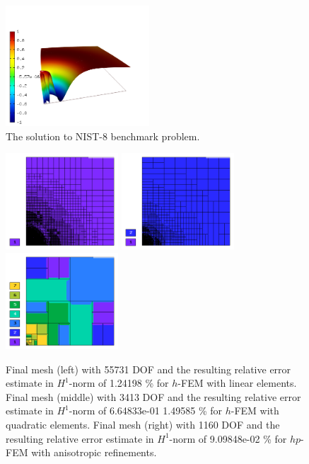 \documentclass[12pt]{elsarticle}
\begin{document}
\begin{figure}[H]
\centering
\vspace{-5mm}
\includegraphics[height=4.5cm]{nist/nist-8/solution.png}
\vspace{-5mm}
\caption{The solution to NIST-8 benchmark problem.}
\vspace{-2mm}
\label{fig:sln-nist08}
\end{figure}

\begin{figure}[H]
\centering
\vspace{-5mm}
\includegraphics[height=3.6cm]{nist/nist-8/mesh_h1_aniso.png}
\includegraphics[height=3.6cm]{nist/nist-8/mesh_h2_aniso.png}
\includegraphics[height=3.6cm]{nist/nist-8/mesh_hp_aniso.png}
\vspace{-5mm}
\caption{
Final mesh (left) with 55731 DOF and the resulting
relative error estimate in $H^1$-norm of 1.24198 \% for $h$-FEM with linear elements.
Final mesh (middle) with 3413 DOF and the resulting
relative error estimate in $H^1$-norm of 6.64833e-01 1.49585 \% for $h$-FEM with quadratic elements.
Final mesh (right) with 1160 DOF and the resulting
relative error estimate in $H^1$-norm of 9.09848e-02 \% for $hp$-FEM with anisotropic refinements.}
\vspace{-5mm}
\label{fig:nist-8-hp-aniso}
\end{figure}
\end{document}
